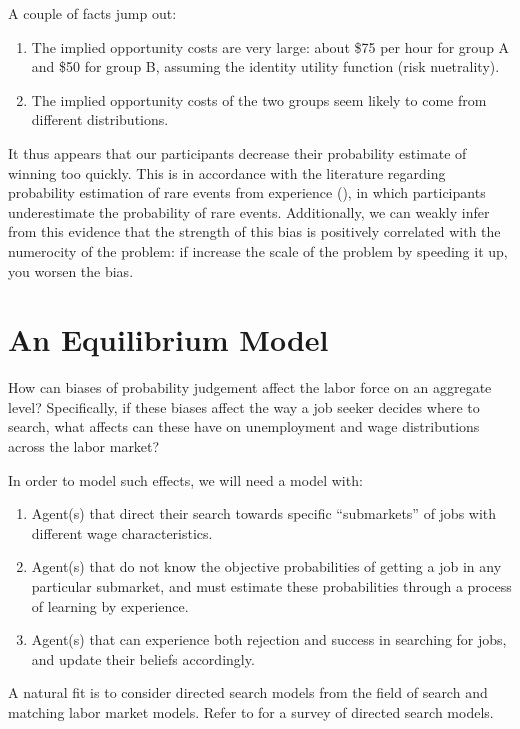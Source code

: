 \documentclass[a4paper,12pt]{article}
\begin{document}
A couple of facts jump out:

\begin{enumerate}
\item The implied opportunity costs are very large: about \$75 per hour for group A and \$50 for group B, assuming the identity utility function (risk nuetrality).
\item The implied opportunity costs of the two groups seem likely to come from different distributions.
\end{enumerate}

It thus appears that our participants decrease their probability estimate of winning too quickly. This is in accordance with the literature regarding probability estimation of rare events from experience (\cite{hertwig2004}), in which participants underestimate the probability of rare events. Additionally, we can weakly infer from this evidence that the strength of this bias is positively correlated with the numerocity of the problem: if increase the scale of the problem by speeding it up, you worsen the bias.



\section{ An Equilibrium Model }

How can biases of probability judgement affect the labor force on an aggregate level? Specifically, if these biases affect the way a job seeker decides where to search, what affects can these have on unemployment and wage distributions across the labor market?

In order to model such effects, we will need a model with:
%
\begin{enumerate}
\item Agent(s) that direct their search towards specific ``submarkets'' of jobs with different wage characteristics.
\item Agent(s) that do not know the objective probabilities of getting a job in any particular submarket, and must estimate these probabilities through a process of learning by experience.
\item Agent(s) that can experience both rejection and success in searching for jobs, and update their beliefs accordingly.
\end{enumerate}
%
A natural fit is to consider directed search models from the field of search and matching labor market models. Refer to \cite{wright2017} for a survey of directed search models.
\end{document}

